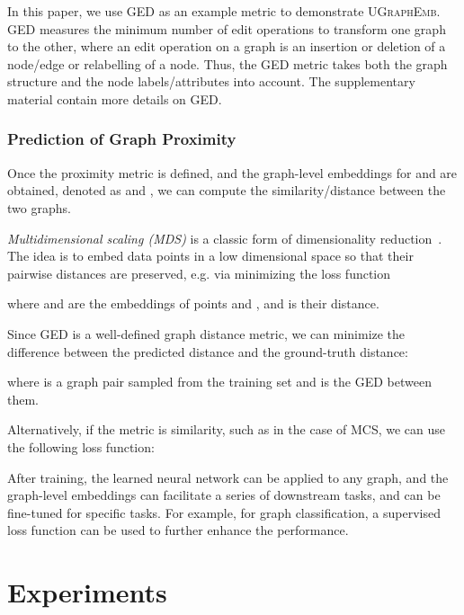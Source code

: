 \documentclass{article}
\newcommand{\model}{\textsc{UGraphEmb}\xspace}
\begin{document}
In this paper, we use GED as an example metric to demonstrate \model. 
GED measures the minimum number of edit operations to transform one graph to the other, where an edit operation on a graph is an insertion or deletion of a node/edge or relabelling of a node. Thus, the GED metric takes both the graph structure and the node labels/attributes into account. The supplementary material contain more details on GED. 


\subsubsection{Prediction of Graph Proximity}


Once the proximity metric is defined, and the graph-level embeddings for  and  are obtained, denoted as  and , we can compute the similarity/distance between the two graphs.

\emph{Multidimensional scaling (MDS)} is a classic form of dimensionality reduction~\cite{williams2001connection}. The idea is to embed data points in a low dimensional space so that their pairwise distances are preserved, e.g. via minimizing the loss function

where  and  are the embeddings of points  and , and  is their distance. 

Since GED is a well-defined graph distance metric, we can minimize the difference between the predicted distance and the ground-truth distance:

where  is a graph pair sampled from the training set and  is the GED between them. 


Alternatively, if the metric is similarity, such as in the case of MCS, we can use the following loss function:














After training, the learned neural network can be applied to any graph, and the graph-level embeddings can facilitate a series of downstream tasks, and can be fine-tuned for specific tasks. For example, for graph classification, a supervised loss function can be used to further enhance the performance. 
 \section{Experiments} 
\label{sec-exp}
\end{document}
